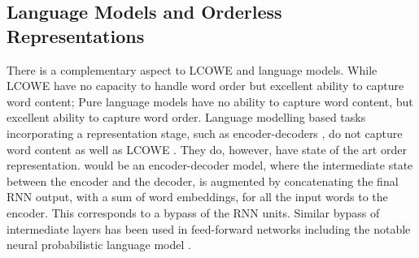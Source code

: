\documentclass{book}
\begin{document}
\subsection{Language Models and Orderless Representations}

There is a complementary aspect to LCOWE and language models.
While LCOWE have no capacity to handle word order but excellent ability to capture word content;
Pure language models have no ability to capture word content, but excellent ability to capture word order.
Language modelling based tasks incorporating a representation stage, such as encoder-decoders \citep{cho-EtAl:2014:EMNLP2014}, do not capture word content as well as LCOWE \citep{ac2018probingsentencevectors}.
They do, however, have state of the art order representation.
would be an encoder-decoder model,
where the intermediate state between the encoder and the decoder,
is augmented by concatenating the final RNN output, with a sum of word embeddings, for all the input words to the encoder.
This corresponds to a bypass of the RNN units.
Similar bypass of intermediate layers has been used in feed-forward networks including the notable neural probabilistic language model \citep{NPLM}.
\end{document}
